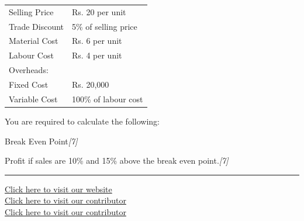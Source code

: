 \documentclass[11pt,a4paper]{article}
\newcommand{\pts}[1]{\hfill   \textit{[#1]}}
\begin{document}
\begin{center}

\begin{tabular}{ll}
  Selling Price & Rs. 20 per unit \\
  Trade Discount & 5\% of selling price \\
  Material Cost & Rs. 6 per unit \\
  Labour Cost & Rs. 4 per unit \\
  Overheads: & \\
  \quad Fixed Cost & Rs. 20,000 \\
  \quad Variable Cost & 100\% of labour cost \\
\end{tabular}
\end{center}
You are required to calculate the following:

\begin{parts}
  \item Break Even Point\pts{7}
  \item Profit if sales are 10\% and 15\% above the break even point.\pts{7}
\end{parts}

\vfill
\rule{\linewidth}{0.4pt}

\begin{center}\small
\href{https://bhu-exam.vercel.app/}{Click here to visit our website}\\[4pt]
\href{https://me-aryan.vercel.app/}{Click here to visit our contributor}\\[4pt]
\href{https://quashan-me.vercel.app/}{Click here to visit our contributor}
\end{center}
\end{document}
